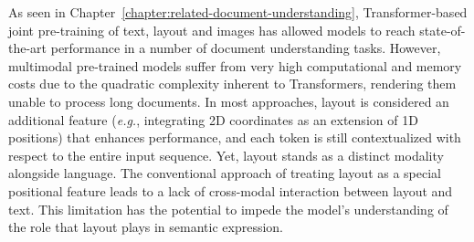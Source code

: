 \newpage

\minitoc
{}


As seen in Chapter~\ref{chapter:related-document-understanding}, Transformer-based joint pre-training of text, layout and images has allowed models to reach state-of-the-art performance in a number of document understanding tasks. However, multimodal pre-trained models suffer from very high computational and memory costs due to the quadratic complexity inherent to Transformers, rendering them unable to process long documents. In most approaches, layout is considered an additional feature (\textit{e.g.}, integrating 2D coordinates as an extension of 1D positions) that enhances performance, and each token is still contextualized with respect to the entire input sequence. Yet, layout stands as a distinct modality alongside language. The conventional approach of treating layout as a special positional feature leads to a lack of cross-modal interaction between layout and text. This limitation has the potential to impede the model's understanding of the role that layout plays in semantic expression.

